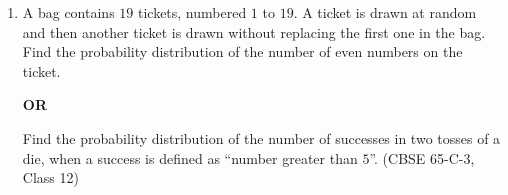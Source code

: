 \begin{enumerate}[label=\thesubsection.\arabic*., ref=\thesubsection.\theenumi]
\solution The vertices are
\begin{align}
\vec{A} = \myvec{2\\-1\\1},\quad
\vec{B} = \myvec{1\\-3\\-5},\quad
\vec{C} = \myvec{3\\-4\\-4}
\end{align}
The sides are
\begin{align}
\vec{B}-\vec{A} = \myvec{-1\\-2\\-6},\quad
\vec{C}-\vec{B} = \myvec{2\\-1\\1},\quad
\vec{A}-\vec{C} = \myvec{-1\\3\\5}
\end{align}
From \eqref{eq:c12-norm},
\begin{align}
\norm{\vec{A}-\vec{B}}^2 = 41,\quad
\norm{\vec{B}-\vec{C}}^2 = 6,\quad
\norm{\vec{C}-\vec{A}}^2 = 35
\end{align}
Since $41=6+35$, from \eqref{eq:c12-pyth} the triangle is right-angled at $\vec{C}$. This is confirmed by
\begin{align}
\brak{\vec{A}-\vec{C}}^{\top}\brak{\vec{B}-\vec{C}}
= \myvec{-1&3&5}\myvec{-2\\1\\-1} = 2+3-5 = 0
\end{align}
 
\begin{center}
\end{center}
 
\item A bag contains $19$ tickets, numbered $1$ to $19$. A ticket is drawn at random and then another ticket is drawn without replacing the first one in the bag. Find the probability distribution of the number of even numbers on the ticket.
\begin{center}\textbf{OR}\end{center}
Find the probability distribution of the number of successes in two tosses of a die, when a success is defined as ``number greater than $5$''.
\hfill (CBSE 65-C-3, Class 12)
 

\end{enumerate}
